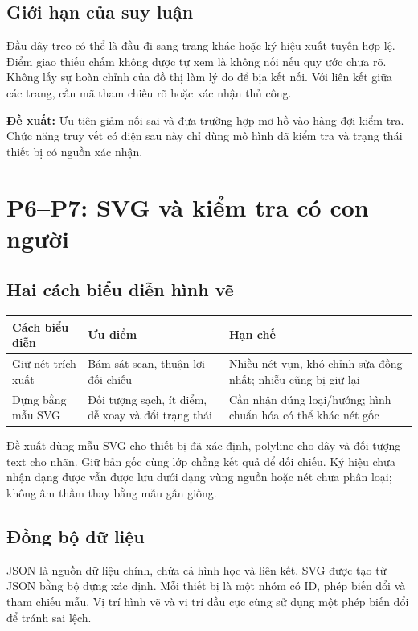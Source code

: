 \documentclass[11pt,a4paper]{article}
\newcommand{\decision}[1]{\par\smallskip\noindent\colorbox{Pale}{\parbox{\dimexpr\linewidth-2\fboxsep\relax}{\textbf{Đề xuất:} #1}}\par\smallskip}
\begin{document}
\subsection{Giới hạn của suy luận}
Đầu dây treo có thể là đầu đi sang trang khác hoặc ký hiệu xuất tuyến hợp lệ. Điểm giao thiếu chấm không được tự xem là không nối nếu quy ước chưa rõ. Không lấy sự hoàn chỉnh của đồ thị làm lý do để bịa kết nối. Với liên kết giữa các trang, cần mã tham chiếu rõ hoặc xác nhận thủ công.

\decision{Ưu tiên giảm nối sai và đưa trường hợp mơ hồ vào hàng đợi kiểm tra. Chức năng truy vết có điện sau này chỉ dùng mô hình đã kiểm tra và trạng thái thiết bị có nguồn xác nhận.}

\clearpage
\section{P6--P7: SVG và kiểm tra có con người}
\subsection{Hai cách biểu diễn hình vẽ}
\begin{tabularx}{\linewidth}{@{}p{35mm}Y Y@{}}
\toprule
\textbf{Cách biểu diễn} & \textbf{Ưu điểm} & \textbf{Hạn chế}\\\midrule
Giữ nét trích xuất & Bám sát scan, thuận lợi đối chiếu & Nhiều nét vụn, khó chỉnh sửa đồng nhất; nhiễu cũng bị giữ lại\\
Dựng bằng mẫu SVG & Đối tượng sạch, ít điểm, dễ xoay và đổi trạng thái & Cần nhận đúng loại/hướng; hình chuẩn hóa có thể khác nét gốc\\\bottomrule
\end{tabularx}

Đề xuất dùng mẫu SVG cho thiết bị đã xác định, polyline cho dây và đối tượng text cho nhãn. Giữ bản gốc cùng lớp chồng kết quả để đối chiếu. Ký hiệu chưa nhận dạng được vẫn được lưu dưới dạng vùng nguồn hoặc nét chưa phân loại; không âm thầm thay bằng mẫu gần giống.

\subsection{Đồng bộ dữ liệu}
JSON là nguồn dữ liệu chính, chứa cả hình học và liên kết. SVG được tạo từ JSON bằng bộ dựng xác định. Mỗi thiết bị là một nhóm có ID, phép biến đổi và tham chiếu mẫu. Vị trí hình vẽ và vị trí đầu cực cùng sử dụng một phép biến đổi để tránh sai lệch.
\end{document}
